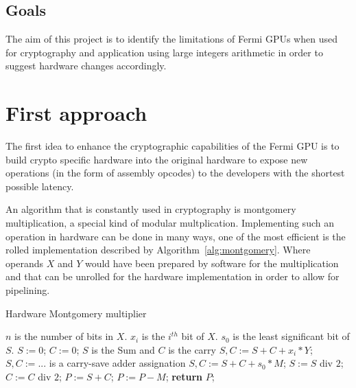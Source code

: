 \documentclass{report}
\begin{document}
\section{Goals}
    The aim of this project is to identify the limitations of Fermi GPUs
    when used for cryptography and application using large integers arithmetic in order to suggest
    hardware changes accordingly.

\chapter{First approach}
    The first idea to enhance the cryptographic capabilities of the Fermi GPU is to
    build crypto specific hardware into the original hardware to expose new 
    operations (in the form of assembly opcodes) to the developers with the 
    shortest possible latency. 
    
    An algorithm that is constantly used in cryptography is montgomery multiplication,
    a special kind of modular multplication. Implementing such an operation in hardware can
    be done in many ways, one of the most efficient is the rolled implementation described
    by Algorithm~\ref{alg:montgomery}. Where operands $X$ and $Y$ would have been prepared
    by software for the multiplication and that can be unrolled for the hardware implementation
    in order to allow for pipelining.
    
    \begin{algorithm}
    \caption{Hardware Montgomery multiplier~\cite{montgomeryHard}}\label{alg:montgomery}
    \begin{algorithmic}[1]
        \Statex $n$ is the number of bits in $X$.
        \Statex $x_i$ is the $i^{th}$ bit of $X$.
        \Statex $s_0$ is the least significant bit of $S$. 		
        \State $S := 0$; $C := 0$; \Comment $S$ is the Sum and $C$ is the carry
            \State $S,C := S + C + x_i * Y$; \Comment $S,C := ...$ is a carry-save adder assignation
            \State $S,C := S + C + s_0 * M$;
            \State $S := S$ div $2$; $C := C$ div $2$;  
        \EndFor
        \State $P := S + C$;
            \State $P := P - M$;
        \EndIf
        \State \textbf{return} $P$;
    \end{algorithmic}
    \end{algorithm}
    
\end{document}
